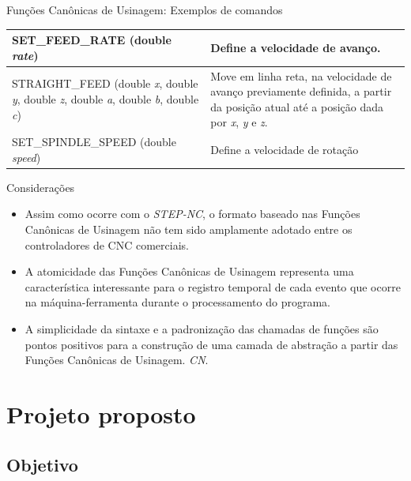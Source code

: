 \documentclass[aspectratio=169]{beamer}
\begin{document}
{\begin{frame}{Funções Canônicas de Usinagem: Exemplos de comandos}
\begin{table}[H]
\begin{tabular}{p{7cm}|p{5cm}}
      \hline  
      \scriptsize{SET\_FEED\_RATE (double \emph{rate})}
      & \scriptsize{Define a velocidade de avan\c co.} \\

      \hline  
      \scriptsize{STRAIGHT\_FEED (double \emph{x}, double \emph{y}, double \emph{z}, 
      double \emph{a}, double \emph{b}, double \emph{c})} 
      & \scriptsize{Move em linha reta, na velocidade de avan\c co previamente definida, 
      a partir da posi\c c\~ao atual at\'e a 
      posi\c c\~ao dada por \emph{x}, \emph{y} e \emph{z}.} \\

      \hline  
      \scriptsize{SET\_SPINDLE\_SPEED (double \emph{speed})} 
      & \scriptsize{Define a velocidade de rotação} \\

      \hline

    \end{tabular}
  \end{table}
\end{frame}


\begin{frame}{Considerações}

  \begin{itemize}
    \item Assim como ocorre com o \emph{STEP-NC}, o formato baseado nas 
          Funções Canônicas de Usinagem não tem sido amplamente adotado 
          entre os controladores de CNC comerciais.
    \item A atomicidade das Funções Canônicas de Usinagem representa uma 
          característica interessante para o registro temporal de cada 
          evento que ocorre na máquina-ferramenta durante o processamento 
          do programa.
    \item A simplicidade da sintaxe e a padronização das chamadas de 
          funções são pontos positivos para a construção de uma camada 
          de abstração a partir das Funções Canônicas de Usinagem.
    \emph{CN}.

  \end{itemize}

\end{frame}


\section{Projeto proposto}

\subsection{Objetivo}

}
\end{document}
